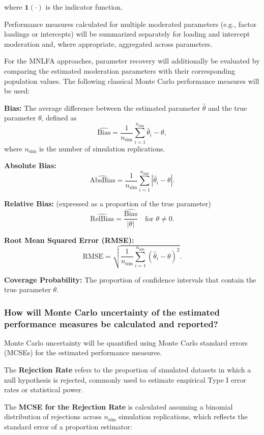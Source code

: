 \documentclass[
  man,
  floatsintext]{apa7}
\begin{document}
where \(\mathbf{1}(\cdot)\) is the indicator function.

Performance measures calculated for multiple moderated parameters (e.g.,
factor loadings or intercepts) will be summarized separately for loading
and intercept moderation and, where appropriate, aggregated across
parameters.

For the MNLFA approaches, parameter recovery will additionally be
evaluated by comparing the estimated moderation parameters with their
corresponding population values. The following classical Monte Carlo
performance measures will be used:

\textbf{Bias:} The average difference between the estimated parameter
\(\hat{\theta}\) and the true parameter \(\theta\), defined as \[
\widehat{\text{Bias}} = \frac{1}{n_{\text{sim}}} \sum_{i=1}^{n_{\text{sim}}} \hat{\theta}_i - \theta,
\] where \(n_{\text{sim}}\) is the number of simulation replications.

\textbf{Absolute Bias:} \[
\widehat{\text{AbsBias}} = \frac{1}{n_{\text{sim}}} \sum_{i=1}^{n_{\text{sim}}} \left| \hat{\theta}_i - \theta \right|.
\]

\textbf{Relative Bias:} (expressed as a proportion of the true
parameter) \[
\widehat{\text{RelBias}} = \frac{\widehat{\text{Bias}}}{|\theta|} \quad \text{for } \theta \neq 0.
\]

\textbf{Root Mean Squared Error (RMSE):} \[
\widehat{\text{RMSE}} = \sqrt{ \frac{1}{n_{\text{sim}}} \sum_{i=1}^{n_{\text{sim}}} (\hat{\theta}_i - \theta)^2}.
\]

\textbf{Coverage Probability:} The proportion of confidence intervals
that contain the true parameter \(\theta\).

\subsubsection{How will Monte Carlo uncertainty of the estimated
performance measures be calculated and
reported?}\label{how-will-monte-carlo-uncertainty-of-the-estimated-performance-measures-be-calculated-and-reported}

Monte Carlo uncertainty will be quantified using Monte Carlo standard
errors (MCSEs) for the estimated performance measures.

The \textbf{Rejection Rate} refers to the proportion of simulated
datasets in which a null hypothesis is rejected, commonly used to
estimate empirical Type I error rates or statistical power.

The \textbf{MCSE for the Rejection Rate} is calculated assuming a
binomial distribution of rejections across \(n_{\text{sim}}\) simulation
replications, which reflects the standard error of a proportion
estimator:
\end{document}
